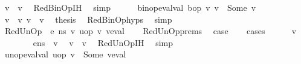 \begin{isabellebody}
\ {\isachardoublequoteopen}v{}\ {\isacharequal}{\kern0pt}\ v{}{\isacharprime}{\kern0pt}{\isachardoublequoteclose}\ \isamarkupfalse%
\ RedBinOp{\isachardot}{\kern0pt}IH\ \isamarkupfalse%
\ simp\isanewline
\ \ \ \ \isamarkupfalse%
\ {\isachardoublequoteopen}binop{\isacharunderscore}{\kern0pt}eval{\isacharunderscore}{\kern0pt}val\ bop\ v{}{\isacharprime}{\kern0pt}\ v{}{\isacharprime}{\kern0pt}\ {\isacharequal}{\kern0pt}\ Some\ v{\isacharprime}{\kern0pt}{\isachardoublequoteclose}\isanewline
\ \ \ \ \isamarkupfalse%
\ {\isacartoucheopen}v{}\ {\isacharequal}{\kern0pt}\ v{}{\isacharprime}{\kern0pt}{\isacartoucheclose}\ {\isacartoucheopen}v{}\ {\isacharequal}{\kern0pt}\ v{}{\isacharprime}{\kern0pt}{\isacartoucheclose}\ \isamarkupfalse%
\ {\isacharquery}{\kern0pt}thesis\ \isamarkupfalse%
\ RedBinOp{\isachardot}{\kern0pt}hyps\ \isamarkupfalse%
\ simp\isanewline
\ \ \isamarkupfalse%
\isanewline
{}\isamarkupfalse%
\isanewline
\ \ \isamarkupfalse%
\ {\isacharparenleft}{\kern0pt}RedUnOp\ {\isasymOmega}\ e\ n{\isacharunderscore}{\kern0pt}s\ v\ uop\ v{\isacharprime}{\kern0pt}\ veval{\isacharparenright}{\kern0pt}\isanewline
\ \ \isamarkupfalse%
\ RedUnOp{\isachardot}{\kern0pt}prems\ \isamarkupfalse%
\ {\isacharquery}{\kern0pt}case\isanewline
\ \ \isamarkupfalse%
\ {\isacharparenleft}{\kern0pt}cases{\isacharparenright}{\kern0pt}\isanewline
\ \ \ \ \isamarkupfalse%
\ v{}\isanewline
\ \ \ \ \isamarkupfalse%
\ {\isachardoublequoteopen}{\isasymLambda}{\isacharcomma}{\kern0pt}{\isasymGamma}{\isacharcomma}{\kern0pt}{\isasymOmega}\ {\isasymturnstile}\ {\isasymlangle}e{\isacharcomma}{\kern0pt}n{\isacharunderscore}{\kern0pt}s{\isasymrangle}\ {\isasymDown}\ v{}{\isachardoublequoteclose}\ \isamarkupfalse%
\ {\isachardoublequoteopen}v{}\ {\isacharequal}{\kern0pt}\ v{\isachardoublequoteclose}\ \isamarkupfalse%
\ RedUnOp{\isachardot}{\kern0pt}IH\ \isamarkupfalse%
\ simp\isanewline
\ \ \ \ \isamarkupfalse%
\ {\isachardoublequoteopen}unop{\isacharunderscore}{\kern0pt}eval{\isacharunderscore}{\kern0pt}val\ uop\ v{}\ {\isacharequal}{\kern0pt}\ Some\ veval{\isachardoublequoteclose}\isanewline

\end{isabellebody}
